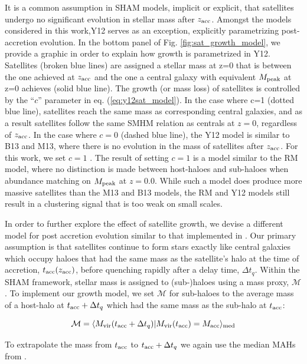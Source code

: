 \documentclass[a4paper,fleqn,usenatbib]{mnras}
\begin{document}
It is a common assumption in SHAM models, implicit or explicit, that satellites undergo no significant evolution in stellar mass after $z_{\rm acc}$.  Amongst the models considered in this work,Y12 serves as an exception, explicitly parametrizing post-accretion evolution.  In the bottom panel of Fig. \ref{fig:sat_growth_model}, we provide a graphic in order to explain how growth is parametrized in Y12.  Satellites (broken blue lines) are assigned a stellar mass at z=0 that is between the one achieved at $z_{\rm acc}$ and the one a central galaxy with equivalent $M_{\rm peak}$ at z=0 achieves (solid blue line).  The growth (or mass loss) of satellites is controlled by the ``$c$'' parameter in eq. (\ref{eq:y12sat_model}).  In the case where c=1 (dotted blue line), satellites reach the same mass as corresponding central galaxies, and as a result satellites follow the same SMHM relation as centrals at $z=0$, regardless of $z_{\rm acc}$.  In the case where $c=0$ (dashed blue line), the Y12 model is similar to B13 and M13, where there is no evolution in the mass of satellites after $z_{\rm acc}$.  For this work, we set $c = 1$ \citep[consistent with SMF2 FIT-2PCF in table 4 in][]{Yang:2012ew}.  The result of setting $c = 1$ is a model similar to the RM model, where no distinction is made between host-haloes and sub-haloes when abundance matching on $M_{\rm peak}$ at $z=0.0$.  While such a model does produce more massive satellites than the M13 and B13 models, the RM and Y12 models still result in a clustering signal that is too weak on small scales.

In order to further explore the effect of satellite growth, we devise a different model for post accretion evolution similar to that implemented in \cite{Behroozi:2015wx}.  Our primary assumption is that satellites continue to form stars exactly like central galaxies which occupy haloes that had the same mass as the satellite's halo at the time of accretion, $t_{\rm acc}(z_{\rm acc})$, before quenching rapidly after a delay time, $\Delta t_{q}$.  Within the SHAM framework, stellar mass is assigned to (sub-)haloes using a mass proxy, $\mathcal{M}$.  To implement our growth model, we set $\mathcal{M}$ for sub-haloes to the average mass of a host-halo at $t_{\rm acc} + \Delta t_{q}$ which had the same mass as the sub-halo at $t_{\rm acc}$:
%
\begin{linenomath}
\begin{equation}
\mathcal{M} = \langle M_{\rm vir}( t_{\rm acc}+\Delta t_{q}) | M_{\rm vir}( t_{\rm acc}) = M_{\rm acc}\rangle_{\rm med}
\end{equation}
\end{linenomath}
%
To extrapolate the mass from $t_{\rm acc}$ to $t_{\rm acc}+\Delta t_{q}$ we again use the median MAHs from \citet{Bosch:2014cu}.
\end{document}
